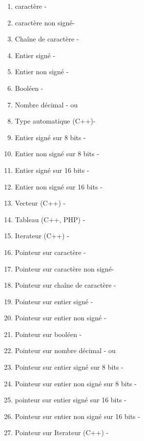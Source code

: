 \begin{enumerate}
    \item caractère - 
    \item caractère non signé- 
    \item Chaîne de caractère - 
    \item Entier signé - 
    \item Entier non signé - 
    \item Booléen - 
    \item Nombre décimal -  ou 
    \item Type automatique (C++)- 
    \item Entier signé sur 8 bits - 
    \item Entier non signé sur 8 bits - 
    \item Entier signé sur 16 bits - 
    \item Entier non signé sur 16 bits -     
    \item Vecteur (C++) -     
    \item Tableau (C++, PHP) -   
    \item Iterateur (C++) -   
    
    \item Pointeur sur caractère - 
    \item Pointeur sur caractère non signé- 
    \item Pointeur sur chaîne de caractère - 
    \item Pointeur sur entier signé - 
    \item Pointeur sur entier non signé - 
    \item Pointeur sur booléen - 
    \item Pointeur sur nombre décimal -  ou 
    \item Pointeur sur entier signé sur 8 bits - 
    \item Pointeur sur entier non signé sur 8 bits - 
    \item pointeur sur entier signé sur 16 bits - 
    \item Pointeur sur entier non signé sur 16 bits -     
    \item Pointeur sur Iterateur (C++) -     
    

\end{enumerate}
